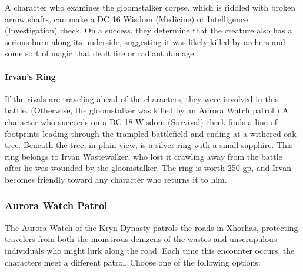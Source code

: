 \documentclass[a4paper, 11pt, bg=full, twocolumn, nooutline]{dndbook}
\begin{document}
A character who examines the gloomstalker corpse, which is riddled with broken arrow shafts, can make a DC 16 Wisdom (Medicine) or Intelligence (Investigation) check. On a success, they determine that the creature also has a serious burn along its underside, suggesting it was likely killed by archers and some sort of magic that dealt fire or radiant damage.

\paragraph{Irvan's Ring}

If the rivals are traveling ahead of the characters, they were involved in this battle. (Otherwise, the gloomstalker was killed by an Aurora Watch patrol.) A character who succeeds on a DC 18 Wisdom (Survival) check finds a line of footprints leading through the trampled battlefield and ending at a withered oak tree. Beneath the tree, in plain view, is a silver ring with a small sapphire. This ring belongs to Irvan Wastewalker, who lost it crawling away from the battle after he was wounded by the gloomstalker. The ring is worth 250 gp, and Irvan becomes friendly toward any character who returns it to him.

\subsubsection{Aurora Watch Patrol}

The Aurora Watch of the Kryn Dynasty patrols the roads in Xhorhas, protecting travelers from both the monstrous denizens of the wastes and unscrupulous individuals who might lurk along the road. Each time this encounter occurs, the characters meet a different patrol. Choose one of the following options:
\end{document}
